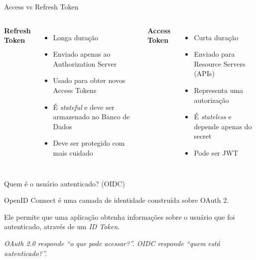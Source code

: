 \documentclass[11pt,aspectratio=169]{beamer}
\begin{document}
\begin{frame}{Access vs Refresh Token}

    \begin{columns}[T,onlytextwidth]


        \textbf{Refresh Token}

        \begin{itemize}
            \item Longa duração
            \item Enviado apenas ao Authorization Server
            \item Usado para obter novos Access Tokens
            \item É \textit{stateful} e deve ser armazenado no Banco de Dados
            \item Deve ser protegido com mais cuidado
        \end{itemize}


        \textbf{Access Token}

        \begin{itemize}
            \item Curta duração
            \item Enviado para Resource Servers (APIs)
            \item Representa uma autorização
            \item É \textit{stateless} e depende apenas do secret
            \item Pode ser JWT
        \end{itemize}

    \end{columns}

\end{frame}

\begin{frame}{Quem é o usuário autenticado? (OIDC)}

    OpenID Connect é uma camada de identidade construída sobre
    OAuth 2.

    Ele permite que uma aplicação obtenha informações sobre o
    usuário que foi autenticado, através de um \textit{ID Token}.

    \begin{center}
        \textit{OAuth 2.0 responde ``o que pode acessar?''.
        OIDC responde ``quem está autenticado?''.}
    \end{center}

\end{frame}
\end{document}
